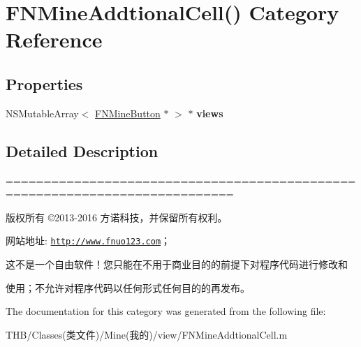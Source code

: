 \hypertarget{category_f_n_mine_addtional_cell_07_08}{}\section{F\+N\+Mine\+Addtional\+Cell() Category Reference}
\label{category_f_n_mine_addtional_cell_07_08}
\subsection*{Properties}
\begin{DoxyCompactItemize}
\item 
\mbox{\label{category_f_n_mine_addtional_cell_07_08_afd3b2d4ce8a6b2bcdf57f538c19a6119}} 
N\+S\+Mutable\+Array$<$ \mbox{\hyperlink{interface_f_n_mine_button}{F\+N\+Mine\+Button}} $\ast$ $>$ $\ast$ {\bfseries views}
\end{DoxyCompactItemize}


\subsection{Detailed Description}
============================================================================

版权所有 ©2013-\/2016 方诺科技，并保留所有权利。

网站地址\+: \href{http://www.fnuo123.com}{\tt http\+://www.\+fnuo123.\+com}； 



这不是一个自由软件！您只能在不用于商业目的的前提下对程序代码进行修改和

使用；不允许对程序代码以任何形式任何目的的再发布。 

 

The documentation for this category was generated from the following file\+:\begin{DoxyCompactItemize}
\item 
T\+H\+B/\+Classes(类文件)/\+Mine(我的)/view/F\+N\+Mine\+Addtional\+Cell.\+m\end{DoxyCompactItemize}
